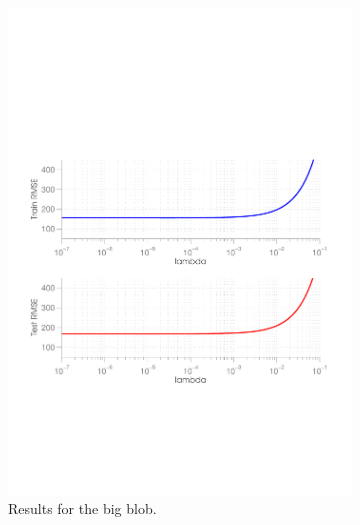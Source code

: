 \begin{figure}[ht]
  \centering
  \begin{subfigure}[b]{0.45\textwidth}
   \includegraphics[width=\textwidth]{figures/lambda_curve1.pdf}
    \caption{Results for the big blob.}
    \label{fig:lambda1}
  \end{subfigure}
  \begin{subfigure}[b]{0.45\textwidth}

\end{subfigure}
\end{figure}
